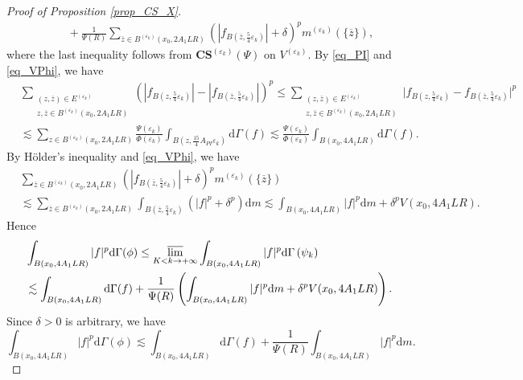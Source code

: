 \documentclass[11pt,a4paper]{article}
\numberwithin{equation}{section}
\theoremstyle{plain}
\theoremstyle{definition}
\begin{document}
\begin{proof}[Proof of Proposition \ref{prop_CS_X}]
\begin{align*}
&\hspace{15pt}+\frac{1}{\Psi(R)}\sum_{\overline{z}\in B^{(\varepsilon_k)}(x_0,2A_1LR)}\left(|f_{B(\overline{z},\frac{5}{4}\varepsilon_k)}|+\delta\right)^pm^{(\varepsilon_k)}(\{\overline{z}\}),
\end{align*}
where the last inequality follows from \hyperref[eq_CS_Veps]{$\mathbf{CS}^{(\varepsilon_k)}(\Psi)$} on $V^{(\varepsilon_k)}$. By \ref{eq_PI} and \ref{eq_VPhi}, we have
\begin{align*}
&\sum_{\substack{(z,\overline{z})\in E^{(\varepsilon_k)}\\z,\overline{z}\in B^{(\varepsilon_k)}(x_0,2A_1LR)}}\left(|f_{B(z,\frac{5}{4}\varepsilon_k)}|-|f_{B(\overline{z},\frac{5}{4}\varepsilon_k)}|\right)^p\le\sum_{\substack{(z,\overline{z})\in E^{(\varepsilon_k)}\\z,\overline{z}\in B^{(\varepsilon_k)}(x_0,2A_1LR)}}\lvert f_{B(z,\frac{5}{4}\varepsilon_k)}-f_{B(\overline{z},\frac{5}{4}\varepsilon_k)}\rvert^p\\
&\lesssim\sum_{z\in B^{(\varepsilon_k)}(x_0,2A_1LR)}\frac{\Psi(\varepsilon_k)}{\Phi(\varepsilon_k)}\int_{B(z,\frac{15}{4}A_{PI}\varepsilon_k)}\mathrm{d}\Gamma(f)\lesssim \frac{\Psi(\varepsilon_k)}{\Phi(\varepsilon_k)}\int_{B(x_0,4A_1LR)}\mathrm{d}\Gamma(f).
\end{align*}
By H\"older's inequality and \ref{eq_VPhi}, we have
\begin{align*}
&\sum_{\overline{z}\in B^{(\varepsilon_k)}(x_0,2A_1LR)}\left(|f_{B(\overline{z},\frac{5}{4}\varepsilon_k)}|+\delta\right)^pm^{(\varepsilon_k)}(\{\overline{z}\})\\
&\lesssim\sum_{\overline{z}\in B^{(\varepsilon_k)}(x_0,2A_1LR)}\int_{B(\overline{z},\frac{5}{4}\varepsilon_k)}\left(|f|^p+\delta^p\right)\mathrm{d} m\lesssim\int_{B(x_0,4A_1LR)}|f|^p\mathrm{d} m+\delta^pV(x_0,4A_1LR).
\end{align*}
Hence
\begin{align*}
&\int_{B(x_0,4A_1LR)}|f|^p\mathrm{d}\Gamma(\phi)\le\varlimsup_{K<k\to+\infty}\int_{B(x_0,4A_1LR)}|f|^p\mathrm{d}\Gamma \left(\psi_k\right)\\
&\lesssim\int_{B(x_0,4A_1LR)}\mathrm{d}\Gamma(f)+\frac{1}{\Psi(R)}\left(\int_{B(x_0,4A_1LR)}|f|^p\mathrm{d} m+\delta^pV(x_0,4A_1LR)\right).
\end{align*}
Since $\delta>0$ is arbitrary, we have
$$\int_{B(x_0,4A_1LR)}|f|^p\mathrm{d}\Gamma(\phi)\lesssim\int_{B(x_0,4A_1LR)}\mathrm{d}\Gamma(f)+\frac{1}{\Psi(R)}\int_{B(x_0,4A_1LR)}|f|^p\mathrm{d} m.$$


\end{proof}
\end{document}
